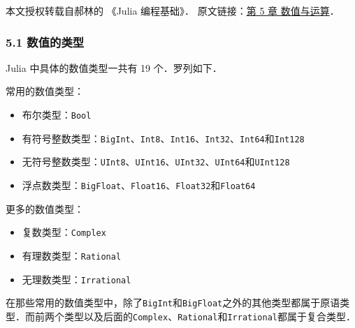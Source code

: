 
本文授权转载自郝林的 《Julia 编程基础》． 原文链接：\href{https://github.com/hyper0x/JuliaBasics/blob/master/book/ch05.md}{第 5 章 数值与运算}．


\subsubsection{5.1 数值的类型}

Julia 中具体的数值类型一共有 19 个．罗列如下．

常用的数值类型：

\begin{itemize}
\item 布尔类型：\verb|Bool|
\item  有符号整数类型：\verb|BigInt|、\verb|Int8|、\verb|Int16|、\verb|Int32|、\verb|Int64|和\verb|Int128|
\item  无符号整数类型：\verb|UInt8|、\verb|UInt16|、\verb|UInt32|、\verb|UInt64|和\verb|UInt128|
\item  浮点数类型：\verb|BigFloat|、\verb|Float16|、\verb|Float32|和\verb|Float64|
\end{itemize}

更多的数值类型：

\begin{itemize}
\item 复数类型：\verb|Complex|
\item 有理数类型：\verb|Rational|
\item 无理数类型：\verb|Irrational|
\end{itemize}

在那些常用的数值类型中，除了\verb|BigInt|和\verb|BigFloat|之外的其他类型都属于原语类型．而前两个类型以及后面的\verb|Complex|、\verb|Rational|和\verb|Irrational|都属于复合类型．